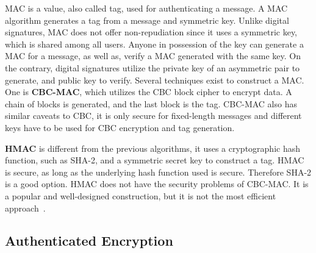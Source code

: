 \ac{MAC} is a value, also called tag, used for authenticating a message.
A \ac{MAC} algorithm generates a tag from a message and symmetric key. Unlike digital signatures, \ac{MAC} does not offer non-repudiation since it uses a symmetric key, which is shared among all users. Anyone in possession of the key can generate a \ac{MAC} for a message, as well as, verify a MAC generated with the same key. On the contrary, digital signatures utilize the private key of an asymmetric pair to generate, and public key to verify.
Several techniques exist to construct a \ac{MAC}. One is \textbf{\ac{CBC-MAC}}, which utilizes the \ac{CBC} block cipher to encrypt data. A chain of blocks is generated, and the last block is the tag.
\ac{CBC-MAC} also has similar caveats to \ac{CBC}, it is only secure for fixed-length messages \cite{aesmodes} and different keys have to be used for \ac{CBC} encryption and tag generation.

\textbf{\ac{HMAC}} is different from the previous algorithms, it uses a cryptographic hash function, such as SHA-2, and a symmetric secret key to construct a tag. \ac{HMAC} is secure, as long as the underlying hash function used is secure. Therefore SHA-2 is a good option.
\ac{HMAC} does not have the security problems of \ac{CBC-MAC}. It is a popular and well-designed construction, but it is not the most efficient approach~\cite{aesmodes}.

\subsection{Authenticated Encryption}\label{chap:background:crypto:aead}

